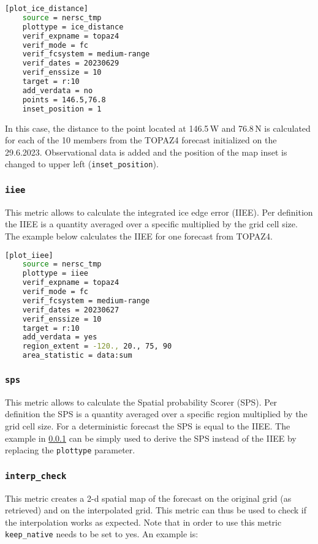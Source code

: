 \documentclass[DIV=10, parskip=full]{scrreprt}
\begin{document}
\begin{lstlisting}[language=bash]
	[plot_ice_distance]
	source = nersc_tmp
	plottype = ice_distance
	verif_expname = topaz4
	verif_mode = fc
	verif_fcsystem = medium-range
	verif_dates = 20230629
	verif_enssize = 10
	target = r:10
	add_verdata = no
	points = 146.5,76.8
	inset_position = 1
\end{lstlisting}

In this case, the distance to the point located at 146.5\,W and 76.8\,N is calculated for each of the 10 members from the TOPAZ4 forecast initialized on the 29.6.2023. Observational data is added and the position of the map inset is changed to upper left (\texttt{inset\_position}).


\subsubsection{\texttt{iiee}}
\label{subsec:iiee}
This metric allows to calculate the integrated ice edge error (IIEE). Per definition the IIEE is a quantity averaged over a specific multiplied by the grid cell size. The example below calculates the IIEE for one forecast from TOPAZ4.

\begin{lstlisting}[language=bash]
	[plot_iiee]
	source = nersc_tmp
	plottype = iiee
	verif_expname = topaz4
	verif_mode = fc
	verif_fcsystem = medium-range
	verif_dates = 20230627
	verif_enssize = 10
	target = r:10
	add_verdata = yes
	region_extent = -120., 20., 75, 90
	area_statistic = data:sum
\end{lstlisting}

\subsubsection{\texttt{sps}}
This metric allows to calculate the Spatial probability Scorer (SPS). Per definition the SPS is a quantity averaged over a specific region multiplied by the grid cell size. For a deterministic forecast the SPS is equal to the IIEE. The example in \ref{subsec:iiee} can be simply used to derive the SPS instead of the IIEE by replacing the \texttt{plottype} parameter. 

\subsubsection{\texttt{interp\_check}}
This metric creates a 2-d spatial map of the forecast on the original grid (as retrieved) and on the interpolated grid. This metric can thus be used to check if the interpolation works as expected. Note that in order to use this metric \texttt{keep\_native} needs to be set to yes. An example is:
\end{document}
